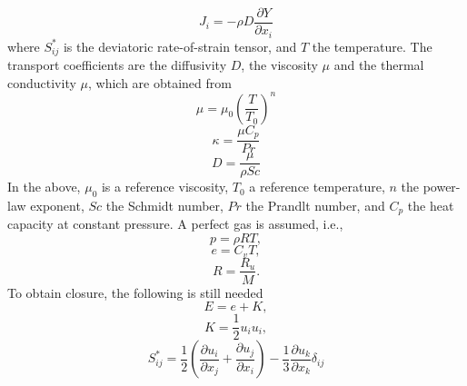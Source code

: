 \documentclass[oneside,a4paper,11pt]{report}
\begin{document}
\begin{equation}
    \label{eq:diffusive_scalar_flux}
    J_i = -\rho D \frac{\partial Y}{\partial x_i} 
\end{equation}
where $S_{ij}^*$ is the deviatoric rate-of-strain tensor, and $T$ the temperature. The transport coefficients are the diffusivity $D$, the viscosity $\mu$ and the thermal conductivity $\mu$, which are obtained from
\begin{equation}
    \mu = \mu_0 \left ( \frac{T}{T_0} \right )^n
\end{equation}
\begin{equation}
    \kappa = \frac{\mu C_p}{Pr}
\end{equation}
\begin{equation}
    D = \frac{\mu}{\rho Sc}
\end{equation}
In the above, $\mu_0$ is a reference viscosity, $T_0$ a reference temperature, $n$ the power-law exponent, $Sc$ the Schmidt number, $Pr$ the Prandlt number, and $C_p$ the heat capacity at constant pressure. A perfect gas is assumed, i.e.,
\begin{equation}
    p = \rho R T,
\end{equation}
\begin{equation} 
    e = C_v T ,
\end{equation}
\begin{equation}
    R = \frac{R_u}{M}.
\end{equation}
To obtain closure, the following is still needed
\begin{equation}
     E = e + K ,
\end{equation}
\begin{equation}
    K = \frac{1}{2} u_i u_i ,
\end{equation}
\begin{equation}
    S^*_{ij} = \frac{1}{2} \left ( \frac{\partial u_i}{\partial x_j} + \frac{\partial u_j}{\partial x_i} \right ) - \frac{1}{3} \frac{\partial u_k}{\partial x_k} \delta_{ij} 
\end{equation}
\end{document}
